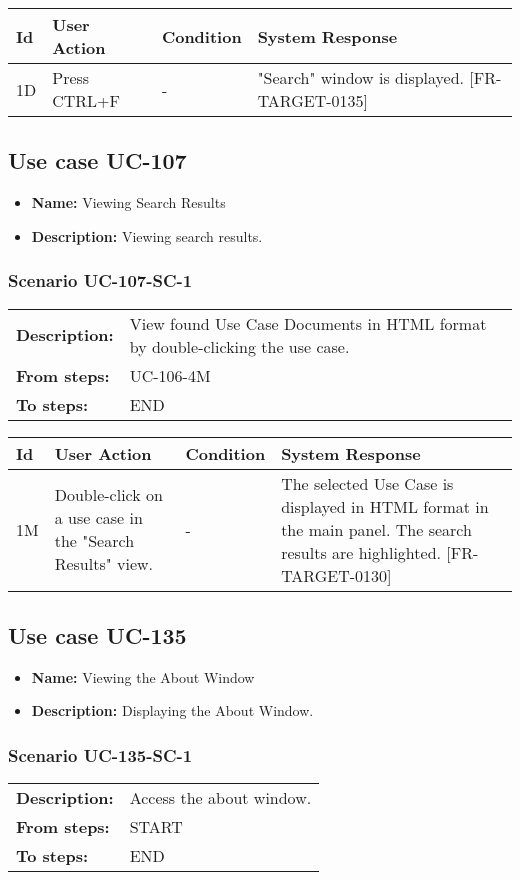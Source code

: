 \documentclass[a4paper,11pt]{article}
\newcommand{\bl}{\\ \hline}
\begin{document}
\begin{tabular}{|p{0.8in}|p{1.6in}|p{1.6in}|p{1.6in}|}
\hline
Id & User Action & Condition & System Response  \bl 
1D & Press CTRL+F & - & "Search" window is displayed. [FR-TARGET-0135] \bl 
\end{tabular}
\subsection*{Use case UC-107}
\begin{itemize}
\item {\bf Name: }Viewing Search Results
\item {\bf Description: }Viewing search results.
\end{itemize}
\subsubsection*{Scenario UC-107-SC-1}
\begin{tabular}{p{1in}p{4in}}
{\bf Description:} & View found Use Case Documents in HTML format by double-clicking the use case. \\
{\bf From steps:} & UC-106-4M \\
{\bf To steps:} & END \\
\end{tabular}
 
\begin{tabular}{|p{0.8in}|p{1.6in}|p{1.6in}|p{1.6in}|}
\hline
Id & User Action & Condition & System Response  \bl 
1M & Double-click on a use case in the "Search Results" view. & - & The selected Use Case is displayed in HTML format in the main panel. The search results are highlighted. [FR-TARGET-0130] \bl 
\end{tabular}
\subsection*{Use case UC-135}
\begin{itemize}
\item {\bf Name: }Viewing the About Window
\item {\bf Description: }Displaying the About Window.
\end{itemize}
\subsubsection*{Scenario UC-135-SC-1}
\begin{tabular}{p{1in}p{4in}}
{\bf Description:} & Access the about window. \\
{\bf From steps:} & START \\
{\bf To steps:} & END \\
\end{tabular}
 
\end{document}
